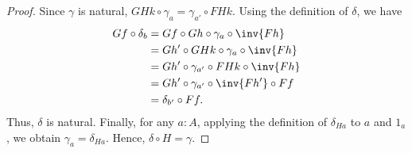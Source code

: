 \begin{proof}
  Since $\gamma$ is natural, $GHk\circ \gamma_a = \gamma_{a'} \circ FHk$.
  Using the definition of $\delta$, we have
  \begin{align*}
    Gf \circ \delta_b
    &= Gf \circ Gh \circ \gamma_a \circ \inv{Fh}\\
    &= Gh' \circ GHk\circ \gamma_a \circ \inv{Fh}\\
    &= Gh' \circ \gamma_{a'} \circ FHk \circ \inv{Fh}\\
    &= Gh' \circ \gamma_{a'} \circ \inv{Fh'} \circ Ff\\
    &= \delta_{b'} \circ Ff.
  \end{align*}
  Thus, $\delta$ is natural.
  Finally, for any $a:A$, applying the definition of $\delta_{Ha}$ to $a$ and $1_a$, we obtain $\gamma_a = \delta_{Ha}$.
  Hence, $\delta \circ H = \gamma$.
\end{proof}
